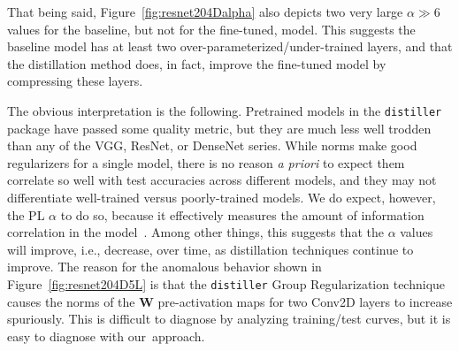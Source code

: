 That being said, Figure~\ref{fig:resnet204Dalpha} also depicts two very large $\alpha\gg 6$ values for the baseline, but not for the fine-tuned, model.
This suggests the baseline model has at least two over-parameterized/under-trained layers, and that the distillation method does, in fact, improve the fine-tuned model by compressing these layers.

The obvious interpretation is the following. 
Pretrained models in the \texttt{distiller} package have passed some quality metric, but they are much less well trodden than any of the 
VGG, ResNet, or DenseNet series.  %
While norms make good regularizers for a single model, there is no reason \emph{a priori} to expect them correlate so well with test accuracies across different models, and they may not differentiate well-trained versus poorly-trained models.
We do expect, however, the PL $\alpha$ to do so, because it effectively measures the amount of information correlation in the model~\cite{MM18_TR, MM19_HTSR_ICML, MM20_SDM}.
Among other things, this suggests that the $\alpha$ values will improve, i.e., decrease, over time, as distillation techniques continue to improve.
The reason for the anomalous behavior shown in 
Figure~\ref{fig:resnet204D5L}
is that the \texttt{distiller} Group Regularization technique 
causes the norms of the $\mathbf{W}$ pre-activation maps for two Conv2D layers to increase spuriously.
This is difficult to diagnose by analyzing training/test curves, but it is easy to diagnose with our~approach.


